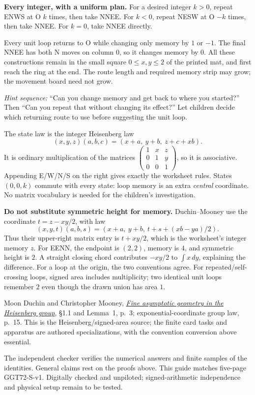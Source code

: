 \documentclass[11pt,letterpaper]{article}
\newcommand{\sectiontitle}[1]{\par\vspace{4pt}{\large\bfseries #1}\par}
\begin{document}
\textbf{Every integer, with a uniform plan.} For a desired integer $k>0$, repeat ENWS at O $k$ times, then take NNEE. For $k<0$, repeat NESW at O $-k$ times, then take NNEE. For $k=0$, take NNEE directly.

Every unit loop returns to O while changing only memory by $1$ or $-1$. The final NNEE has both N moves on column $0$, so it changes memory by $0$. All these constructions remain in the small square $0\leq x,y\leq2$ of the printed mat, and first reach the ring at the end. The route length and required memory strip may grow; the movement board need not grow.

\textit{Hint sequence:} ``Can you change memory and get back to where you started?'' Then ``Can you repeat that without changing its effect?'' Let children decide which returning route to use before suggesting the unit loop.

\sectiontitle{Adult mathematical extension}
The state law is the integer Heisenberg law
\[
(x,y,z)(a,b,c)=(x+a,\ y+b,\ z+c+xb).
\]
It is ordinary multiplication of the matrices
$\left(\begin{smallmatrix}1&x&z\\0&1&y\\0&0&1\end{smallmatrix}\right)$,
so it is associative. Appending E/W/N/S on the right gives exactly the worksheet rules. States $(0,0,k)$ commute with every state: loop memory is an extra \emph{central} coordinate. No matrix vocabulary is needed for the children's investigation.

\textbf{Do not substitute symmetric height for memory.} Duchin--Mooney use the coordinate $t=z-xy/2$, with law
\[
(x,y,t)(a,b,s)=(x+a,\ y+b,\ t+s+(xb-ya)/2).
\]
Thus their upper-right matrix entry is $t+xy/2$, which is the worksheet's integer memory $z$. For EENN, the endpoint is $(2,2)$, memory is $4$, and symmetric height is $2$. A straight closing chord contributes $-xy/2$ to $\int x\,dy$, explaining the difference. For a loop at the origin, the two conventions agree. For repeated/self-crossing loops, signed area includes multiplicity; two identical unit loops remember $2$ even though the drawn union has area $1$.

\sectiontitle{Source and verification}
Moon Duchin and Christopher Mooney, \href{https://arxiv.org/pdf/1106.5276}{\emph{Fine asymptotic geometry in the Heisenberg group}}, \S1.1 and Lemma~1, p.~3; exponential-coordinate group law, p.~15. This is the Heisenberg/signed-area source; the finite card tasks and apparatus are authored specializations, with the convention conversion above essential.

The independent checker verifies the numerical answers and finite samples of the identities. General claims rest on the proofs above. This guide matches five-page GGT72-S-v1. Digitally checked and unpiloted; signed-arithmetic independence and physical setup remain to be tested.
\end{document}
